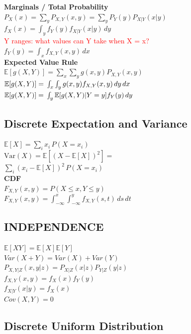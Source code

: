 \textbf{Marginals / Total Probability}\\
$P_X(x) = \sum_y P_{X,Y}(x,y) = \sum_y P_Y(y)P_{X|Y}(x|y)$\\
$f_X(x) = \int_y f_Y(y)f_{X|Y}(x|y) \, dy$\\
\textcolor{red}{Y ranges: what values can Y take when X = x?}\\
$f_Y(y) = \int_x f_{X,Y}(x,y) \, dx$\\

\textbf{Expected Value Rule}\\
$\mathbb{E}[g(X,Y)] = \sum_x \sum_y g(x,y)P_{X,Y}(x,y)$\\
$\mathbb{E}[g(X,Y)] = \\
\int_x \int_y g(x,y)f_{X,Y}(x,y)\,dy\,dx$\\
$\mathbb{E}[g(X,Y)] = \\
\int_y \mathbb{E}[g(X,Y)|Y=y] f_Y(y)\,dy$\\

\subsection*{Discrete Expectation and Variance}

$\mathbb{E}[X] = \sum_{i} x_i \, P(X = x_i)$\\
$\mathrm{Var}(X) = \mathbb{E}\!\left[(X - \mathbb{E}[X])^2\right] =$ \\
$\sum_{i} (x_i - \mathbb{E}[X])^2 \, P(X = x_i)$\\

\textbf{CDF}\\
$F_{X,Y}(x,y) = P(X \le x, Y \le y)$\\
$F_{X,Y}(x,y) = \int_{-\infty}^x \int_{-\infty}^y f_{X,Y}(s,t)\, ds\,dt$\\

\subsection*{INDEPENDENCE}
$\mathbb{E}[XY] = \mathbb{E}[X]\mathbb{E}[Y]$\\
$Var(X + Y) = Var(X) + Var(Y)$\\
$P_{X,Y|Z}(x,y|z) = P_{X|Z}(x|z)P_{Y|Z}(y|z)$\\
$f_{X,Y}(x,y) = f_X(x)f_Y(y)$\\
$f_{X|Y}(x|y) = f_X(x)$\\
$Cov(X,Y) = 0$\\

\subsection*{Discrete Uniform Distribution}


